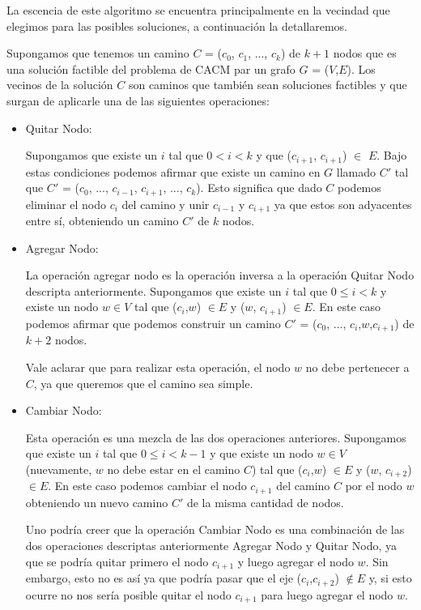 La escencia de este algoritmo se encuentra principalmente en la vecindad que elegimos para las posibles soluciones, a continuación la detallaremos.

Supongamos que tenemos un camino $C$ = ($c_0$, $c_1$, ..., $c_k$) de $k+1$ nodos que es una solución factible del problema de CACM par un grafo $G$ = ($V$,$E$). Los vecinos de la solución $C$ son caminos que también sean soluciones factibles y que surgan de aplicarle una de las siguientes operaciones:

\begin{itemize}
 \item Quitar Nodo:

  Supongamos que existe un $i$ tal que $0 < i < k$ y que ($c_{i+1}$, $c_{i+1}$) $\in$ $E$. Bajo estas condiciones podemos afirmar que existe un camino en $G$ llamado $C'$ tal que $C'$ = ($c_0$, ..., $c_{i-1}$, $c_{i+1}$, ..., $c_k$). Esto significa que dado $C$ podemos eliminar el nodo $c_i$ del camino y unir $c_{i-1}$ y $c_{i+1}$ ya que estos son adyacentes entre sí, obteniendo un camino $C'$ de $k$ nodos.
  \item Agregar Nodo:

  La operación agregar nodo es la operación inversa a la operación Quitar Nodo descripta anteriormente. Supongamos que existe un $i$ tal que $0 \leq i < k$ y existe un nodo $w \in V$ tal que ($c_i$,$w$) $\in E$ y ($w$, $c_{i+1}$) $\in E$. En este caso podemos afirmar que podemos construir un camino $C'$ = ($c_0$, ..., $c_{i}$,$w$,$c_{i+1}$) de $k+2$ nodos.

  Vale aclarar que para realizar esta operación, el nodo $w$ no debe pertenecer a $C$, ya que queremos que el camino sea simple.

  \item Cambiar Nodo:

  Esta operación es una mezcla de las dos operaciones anteriores. Supongamos que existe un $i$ tal que $0 \leq i < k-1$ y que existe un nodo $w \in V$ (nuevamente, $w$ no debe estar en el camino $C$) tal que ($c_i$,$w$) $\in E$ y ($w$, $c_{i+2}$) $\in E$. En este caso podemos cambiar el nodo $c_{i+1}$ del camino $C$ por el nodo $w$ obteniendo un nuevo camino $C'$ de la misma cantidad de nodos.

  Uno podría creer que la operación Cambiar Nodo es una combinación de las dos operaciones descriptas anteriormente Agregar Nodo y Quitar Nodo, ya que se podría quitar primero el nodo $c_{i+1}$ y luego agregar el nodo $w$. Sin embargo, esto no es así ya que podría pasar que el eje ($c_i$,$c_{i+2}$) $\notin E$ y, si esto ocurre no nos sería posible quitar el nodo $c_{i+1}$ para luego agregar el nodo $w$.

\end{itemize}
 

